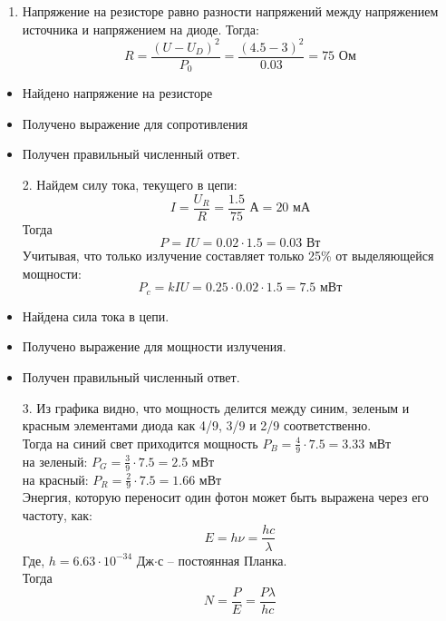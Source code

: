 \solutionSection
\begin{enumerate}
    \item Напряжение на резисторе равно разности напряжений между напряжением источника и напряжением на диоде. Тогда:
    $$R=\frac{(U-U_D)^2}{P_0}=\frac{(4.5-3)^2}{0.03}=75\text{ Ом}$$
    \end{enumerate}
    \additionalCriteria
    \begin{itemize}
    \item Найдено напряжение на резисторе
    \item Получено выражение для сопротивления
    \item Получен правильный численный ответ.
    \end{itemize}
    \begin{enumerate}
    \item [2.] Найдем силу тока, текущего в цепи:
    $$I=\frac{U_R}{R}=\frac{1.5}{75}\text{ А}=20\text{ мА}$$
    Тогда 
    $$P=IU=0.02\cdot1.5=0.03\text{ Вт}$$
    Учитывая, что только излучение составляет только 25\% от выделяющейся мощности:
    $$P_c=kIU=0.25\cdot0.02\cdot1.5=7.5\text{ мВт}$$
    \end{enumerate}
    \additionalCriteria
    \begin{itemize}
    \item Найдена сила тока в цепи.
    \item Получено выражение для мощности излучения.
    \item Получен правильный численный ответ.
    \end{itemize}
    \begin{enumerate}
    \item [3.] Из графика видно, что мощность делится между синим, зеленым и красным элементами диода как 4/9, 3/9 и 2/9 соответственно.\\ 
    Тогда на синий свет приходится мощность $P_B=\frac{4}{9}\cdot7.5=3.33\text{ мВт}$\\
    на зеленый: $P_G=\frac{3}{9}\cdot7.5=2.5\text{ мВт}$\\
    на красный: $P_R=\frac{2}{9}\cdot7.5=1.66\text{ мВт}$\\
    Энергия, которую переносит один фотон может быть выражена через его частоту, как:
    $$E=h\nu=\frac{hc}{\lambda}$$
    Где, $h = 6.63\cdot10^{-34}$ Дж$\cdot$с – постоянная Планка.\\
    Тогда 
    $$N=\frac{P}{E}=\frac{P\lambda}{hc}$$
    \end{enumerate}
